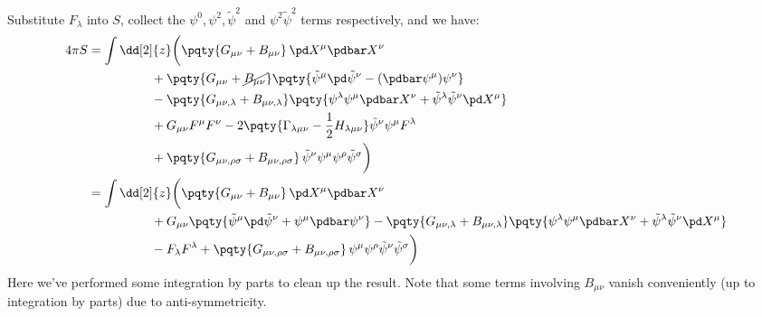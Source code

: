 \documentclass[a4paper,10pt]{article}
\begin{document}
\begin{enumerate}
	Substitute $F_\lambda$ into $S$, collect the $\psi^0, \psi^2, \tilde{\psi}^2$ and $\psi^2\tilde{\psi}^2$ terms respectively, and we have:
	\begin{equation}
	\begin{aligned}
		4\pi S
		&= \int \dd[2]{z}
		\bigg(
			\pqty{G_{\mu\nu} + B_{\mu\nu}}\,
				\pd X^\mu \pdbar X^\nu
			\\ & \hspace{5em}
			+ \pqty{G_{\mu\nu} + \cancel{B_{\mu\nu}}}
			\pqty{
				\tilde{\psi}^\mu
					\pd \tilde{\psi}^\nu
				- (\pdbar \psi^\mu)
					\psi^\nu
			}
			\\ & \hspace{5em}
			- \pqty{
				G_{\mu\nu,\lambda}
				+ B_{\mu\nu,\lambda}
			} \pqty{
				\psi^\lambda
					\psi^\mu \pdbar X^\nu
				+ \tilde{\psi}^\lambda
					\tilde{\psi}^\nu \pd X^\mu
			}
			\\ & \hspace{5em}
			+ G_{\mu\nu} F^\mu F^\nu
			- 2\pqty{
					\Gamma_{\lambda\mu\nu}
					- \frac{1}{2} H_{\lambda\mu\nu}
				} \tilde{\psi}^\nu \psi^\mu
				F^\lambda
			\\ & \hspace{5em}
			+ \pqty{
					G_{\mu\nu,\rho\sigma}
					+ B_{\mu\nu,\rho\sigma}
				}\,
				\tilde{\psi}^\nu \psi^\mu
				\psi^\rho \tilde{\psi}^\sigma
		\bigg) \\
		&= \int \dd[2]{z}
		\bigg(
			\pqty{G_{\mu\nu} + B_{\mu\nu}}\,
				\pd X^\mu \pdbar X^\nu
			\\ & \hspace{5em}
			+ G_{\mu\nu} \pqty{
				\tilde{\psi}^\mu
					\pd \tilde{\psi}^\nu
				+ \psi^\mu
					\pdbar \psi^\nu
			}
			- \pqty{
				G_{\mu\nu,\lambda}
				+ B_{\mu\nu,\lambda}
			} \pqty{
				\psi^\lambda
					\psi^\mu \pdbar X^\nu
				+ \tilde{\psi}^\lambda
					\tilde{\psi}^\nu \pd X^\mu
			}
			\\ & \hspace{5em}
			- F_\lambda F^\lambda
			+ \pqty{
					G_{\mu\nu,\rho\sigma}
					+ B_{\mu\nu,\rho\sigma}
				}\,
				\psi^\mu
				\psi^\rho
				\tilde{\psi}^\nu
				\tilde{\psi}^\sigma
		\bigg) \\
	\end{aligned}
	\end{equation}
	Here we've performed some integration by parts to clean up the result. 
	Note that some terms involving $B_{\mu\nu}$ vanish conveniently (up to integration by parts) due to anti-symmetricity. 
	

\end{enumerate}
\end{document}
